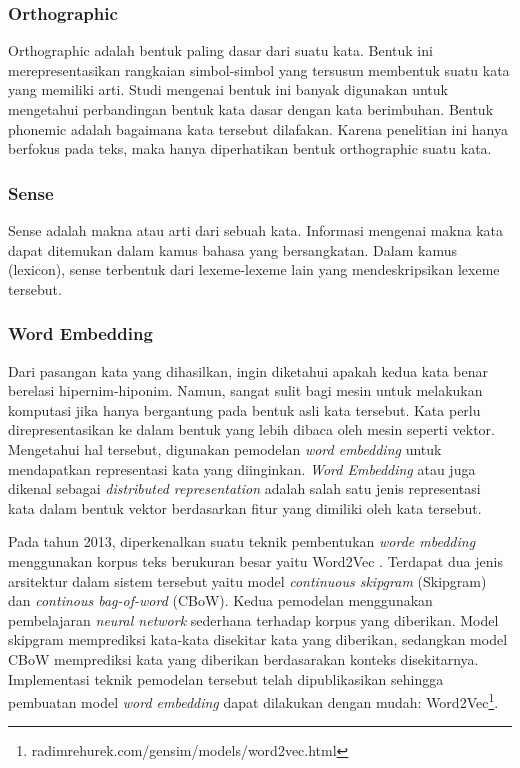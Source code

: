\subsubsection{Orthographic}
Orthographic adalah bentuk paling dasar dari suatu kata. Bentuk ini merepresentasikan rangkaian simbol-simbol yang tersusun membentuk suatu kata yang memiliki arti. Studi mengenai bentuk ini banyak digunakan untuk mengetahui perbandingan bentuk kata dasar dengan kata berimbuhan. Bentuk phonemic adalah bagaimana kata tersebut dilafakan. Karena penelitian ini hanya berfokus pada teks, maka hanya diperhatikan bentuk orthographic suatu kata.

\subsubsection{Sense}
Sense adalah makna atau arti dari sebuah kata. Informasi mengenai makna kata dapat ditemukan dalam kamus bahasa yang bersangkatan. Dalam kamus (lexicon), sense terbentuk dari lexeme-lexeme lain yang mendeskripsikan lexeme tersebut. 

\subsubsection{Word Embedding}
Dari pasangan kata yang dihasilkan, ingin diketahui apakah kedua kata benar berelasi hipernim-hiponim. Namun, sangat sulit bagi mesin untuk melakukan komputasi jika hanya bergantung pada bentuk asli kata tersebut. Kata perlu direpresentasikan ke dalam bentuk yang lebih dibaca oleh mesin seperti vektor. Mengetahui hal tersebut, digunakan pemodelan \textit{word embedding} untuk mendapatkan representasi kata yang diinginkan. \textit{Word Embedding} atau juga dikenal sebagai \textit{distributed representation} adalah salah satu jenis representasi kata dalam bentuk vektor berdasarkan fitur yang dimiliki oleh kata tersebut. 

Pada tahun 2013, diperkenalkan suatu teknik pembentukan \textit{worde mbedding} menggunakan korpus teks berukuran besar yaitu Word2Vec \cite{mikolov2013distributed}. Terdapat dua jenis arsitektur dalam sistem tersebut yaitu model \textit{continuous skipgram} (Skipgram) dan \textit{continous bag-of-word} (CBoW). Kedua pemodelan menggunakan pembelajaran \textit{neural network} sederhana terhadap korpus yang diberikan. Model skipgram memprediksi kata-kata disekitar kata yang diberikan, sedangkan model CBoW memprediksi kata yang diberikan berdasarakan konteks disekitarnya. Implementasi teknik pemodelan tersebut telah dipublikasikan sehingga pembuatan model \textit{word embedding} dapat dilakukan dengan mudah: Word2Vec\footnote{radimrehurek.com/gensim/models/word2vec.html}.

